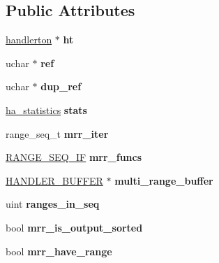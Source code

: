 \subsection*{Public Attributes}
\begin{DoxyCompactItemize}
\item 
\mbox{\label{classhandler_a395bae75af9e51a116097a788b2cf57f}} 
\mbox{\hyperlink{structhandlerton}{handlerton}} $\ast$ {\bfseries ht}
\item 
\mbox{\label{classhandler_a53c7037216007ba6140e6cff5162024d}} 
uchar $\ast$ {\bfseries ref}
\item 
\mbox{\label{classhandler_a7501dc41ecb010069e8bc9d035aae6aa}} 
uchar $\ast$ {\bfseries dup\+\_\+ref}
\item 
\mbox{\label{classhandler_a1df561df4b2b6552a7b42189feb0400a}} 
\mbox{\hyperlink{classha__statistics}{ha\+\_\+statistics}} {\bfseries stats}
\item 
\mbox{\label{classhandler_a9ec520eba79eb9f182c534e82c60ebc6}} 
range\+\_\+seq\+\_\+t {\bfseries mrr\+\_\+iter}
\item 
\mbox{\label{classhandler_a2a51e423645829d3e540c109556931fa}} 
\mbox{\hyperlink{structst__range__seq__if}{R\+A\+N\+G\+E\+\_\+\+S\+E\+Q\+\_\+\+IF}} {\bfseries mrr\+\_\+funcs}
\item 
\mbox{\label{classhandler_a52372127bd238a7f622190316ba8124f}} 
\mbox{\hyperlink{structst__handler__buffer}{H\+A\+N\+D\+L\+E\+R\+\_\+\+B\+U\+F\+F\+ER}} $\ast$ {\bfseries multi\+\_\+range\+\_\+buffer}
\item 
\mbox{\label{classhandler_a1a476dfe8526807dfc820c4b09f7a6d1}} 
uint {\bfseries ranges\+\_\+in\+\_\+seq}
\item 
\mbox{\label{classhandler_adff4dfb21c4583b55afc4fe5aba50389}} 
bool {\bfseries mrr\+\_\+is\+\_\+output\+\_\+sorted}
\item 
\mbox{\label{classhandler_af2632d137c3a17fa583f08db5681e80a}} 
bool {\bfseries mrr\+\_\+have\+\_\+range}

\end{DoxyCompactItemize}
